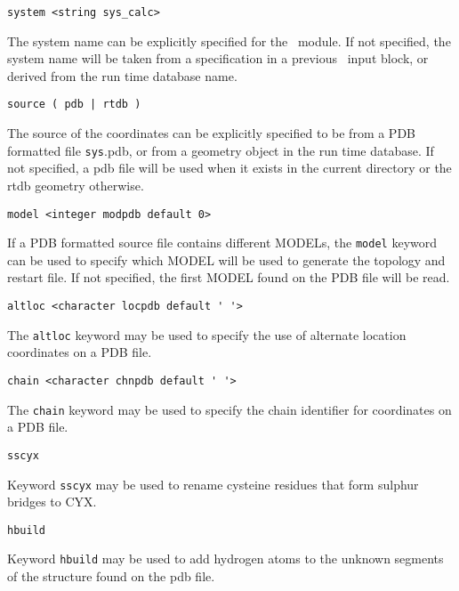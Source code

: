 \begin{verbatim}
system <string sys_calc>
\end{verbatim}

The system name can be explicitly specified for the \prepare\ module.
If not specified, the system name will be taken from a specification
in a previous \md\ input block, or derived from the run time database
name.

\begin{verbatim}
source ( pdb | rtdb )
\end{verbatim}

The source of the coordinates can be explicitly specified to be from
a PDB formatted file \verb+sys+.pdb, or from a geometry object in the run
time database. If not specified, a pdb file will be used when it exists
in the current directory or the rtdb geometry otherwise.

\begin{verbatim}
model <integer modpdb default 0>
\end{verbatim}

If a PDB formatted source file contains different MODELs, the \verb+model+
keyword can be used to specify which MODEL will be used to generate the
topology and restart file. If not specified, the first MODEL found on the
PDB file will be read.

\begin{verbatim}
altloc <character locpdb default ' '>
\end{verbatim}

The \verb+altloc+ keyword may be used to specify the use of alternate
location coordinates on a PDB file.

\begin{verbatim}
chain <character chnpdb default ' '>
\end{verbatim}

The \verb+chain+ keyword may be used to specify the chain identifier
for coordinates on a PDB file.

\begin{verbatim}
sscyx
\end{verbatim}

Keyword \verb+sscyx+ may be used to rename cysteine residues that form
sulphur bridges to CYX.

\begin{verbatim}
hbuild
\end{verbatim}

Keyword \verb+hbuild+ may be used to add hydrogen atoms to the
unknown segments of the structure found on the pdb file.


